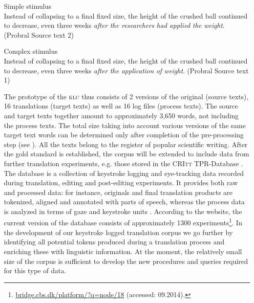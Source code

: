 \documentclass[output=paper]{LSP/langsci}
\begin{document}
\ea \label{ex:1:1} Simple stimulus\\
Instead of collapsing to a final fixed size, the height of the crushed ball continued to decrease, even three weeks \emph{after the researchers had applied the weight}. (Probral Source text 2)
\z

\ea \label{ex:1:2}
Complex stimulus\\
Instead of collapsing to a final fixed size, the height of the crushed ball continued to decrease, even three weeks \emph{after the application of weight}. (Probral Source text 1)
\z

The prototype of the \textsc{klc} thus consists of 2 versions of the original (source texts), 16 translations (target texts) as well as 16 log files (process texts). The source and target texts together amount to approximately 3,650 words, not including the process texts. The total size taking into account various versions of the same target text words can be determined only after completion of the pre-processing step (see ). All the texts belong to the register of popular scientific writing. After the gold standard is established, the corpus will be extended to include data from further translation experiments, e.g. those stored in the CRI\textsc{tt} TPR-Database \citep{Carl2012}. The database is a collection of keystroke logging and eye-tracking data recorded during translation, editing and post-editing experiments. It provides both raw and processed data: for instance, originals and final translation products are tokenized, aligned and annotated with parts of speech, whereas the process data is analyzed in terms of gaze and keystroke units \citep{Carl2012}. According to the website, the current version of the database consists of approximately 1300 experiments\footnote{\url{bridge.cbs.dk/platform/?q=node/18} (accessed: 09.2014).}. In the development of our keystroke logged translation corpus we go further by identifying all potential tokens produced during a translation process and enriching these with linguistic information. At the moment, the relatively small size of the corpus is sufficient to develop the new procedures and queries required for this type of data. 
\end{document}

